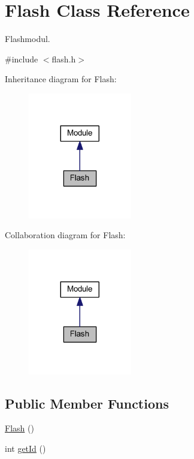 \hypertarget{class_flash}{}\section{Flash Class Reference}
\label{class_flash}


Flashmodul.  




{\ttfamily \#include $<$flash.\+h$>$}



Inheritance diagram for Flash\+:\nopagebreak
\begin{figure}[H]
\begin{center}
\leavevmode
\includegraphics[width=128pt]{class_flash__inherit__graph}
\end{center}
\end{figure}


Collaboration diagram for Flash\+:\nopagebreak
\begin{figure}[H]
\begin{center}
\leavevmode
\includegraphics[width=128pt]{class_flash__coll__graph}
\end{center}
\end{figure}
\subsection*{Public Member Functions}
\begin{DoxyCompactItemize}
\item 
\mbox{\hyperlink{class_flash_a67aac213fb3576b2a3ae1d5862f99812}{Flash}} ()
\item 
int \mbox{\hyperlink{class_flash_a12eecf14803a94e5081ed03c755fe5d8}{get\+Id}} ()
\end{DoxyCompactItemize}


